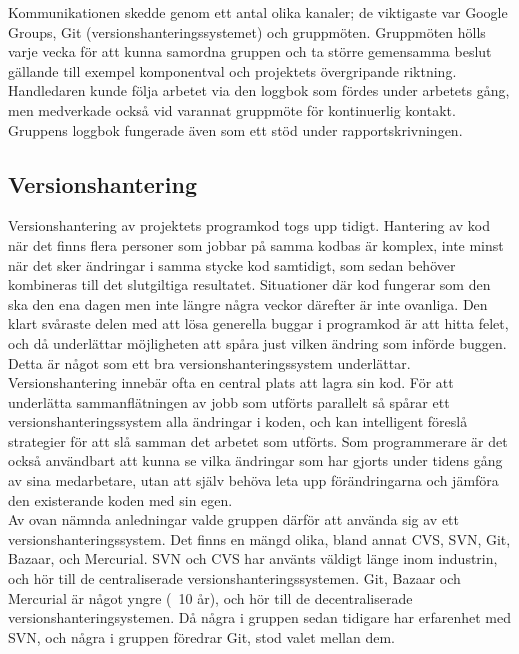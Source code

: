 \documentclass[a4paper,11pt]{article}
\begin{document}
Kommunikationen skedde genom ett antal olika kanaler; de viktigaste var Google Groups, Git (versionshanteringssystemet) och gruppmöten. Gruppmöten hölls varje vecka för att kunna samordna gruppen och ta större gemensamma beslut gällande till exempel komponentval och projektets övergripande riktning. Handledaren kunde följa arbetet via den loggbok som fördes under arbetets gång, men medverkade också vid varannat gruppmöte för kontinuerlig kontakt. Gruppens loggbok fungerade även som ett stöd under rapportskrivningen.

\subsection{Versionshantering}
Versionshantering av projektets programkod togs upp tidigt. Hantering av kod när det finns flera personer som jobbar på samma kodbas är komplex, inte minst när det sker ändringar i samma stycke kod samtidigt, som sedan behöver kombineras till det slutgiltiga resultatet. Situationer där kod fungerar som den ska den ena dagen men inte längre några veckor därefter är inte ovanliga. Den klart svåraste delen med att lösa generella buggar i programkod är att hitta felet, och då underlättar möjligheten att spåra just vilken ändring som införde buggen. Detta är något som ett bra versionshanteringssystem underlättar.\\

Versionshantering innebär ofta en central plats att lagra sin kod. För att underlätta sammanflätningen av jobb som utförts parallelt så spårar ett versionshanteringssystem alla ändringar i koden, och kan intelligent föreslå strategier för att slå samman det arbetet som utförts. Som programmerare är det också användbart att kunna se vilka ändringar som har gjorts under tidens gång av sina medarbetare, utan att själv behöva leta upp förändringarna och jämföra den existerande koden med sin egen.\\

Av ovan nämnda anledningar valde gruppen därför att använda sig av ett versionshanteringssystem. Det finns en mängd olika, bland annat CVS, SVN, Git, Bazaar, och Mercurial. SVN och CVS har använts väldigt länge inom industrin, och hör till de centraliserade versionshanteringssystemen. Git, Bazaar och Mercurial är något yngre (~10 år), och hör till de decentraliserade versionshanteringsystemen. Då några i gruppen sedan tidigare har erfarenhet med SVN, och några i gruppen föredrar Git, stod valet mellan dem.\\
\end{document}

